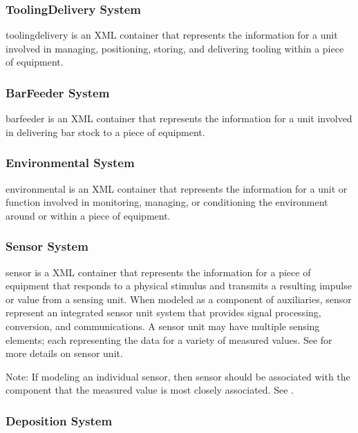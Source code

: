 \documentclass{mtconnect}	%
\providecommand{\DIFadd}[1]{{\hspace{0pt}\protect\color{blue}#1}} %
\providecommand{\DIFaddbegin}{} %
\begin{document}
\subsubsection{ToolingDelivery System}

\gls{toolingdelivery} is an XML container that represents the information for a unit involved in managing, positioning, storing, and delivering tooling within a piece of equipment.

\subsubsection{BarFeeder System}

\gls{barfeeder} is an XML container that represents the information for a unit involved in delivering bar stock to a piece of equipment.

\subsubsection{Environmental System}

\gls{environmental} is an XML container that represents the information for a unit or function involved in monitoring, managing, or conditioning the environment around or within a piece of equipment.

\subsubsection{Sensor System}

\gls{sensor} is a XML container that represents the information for a piece of equipment that responds to a physical stimulus and transmits a resulting impulse or value from a sensing unit.   When modeled as a component of \gls{auxiliaries}, sensor \should represent an integrated \gls{sensor unit} system that provides signal processing, conversion, and communications.  A \gls{sensor unit} may have multiple \glspl{sensing element}; each representing the data for a variety of measured values.  See  for more details on \gls{sensor unit}.

\begin{note}
Note:  If modeling an individual sensor, then sensor should be associated with the component that the measured value is most closely associated.  See .
\end{note}

\DIFaddbegin \subsubsection{\DIFadd{Deposition System}}
\end{document}
